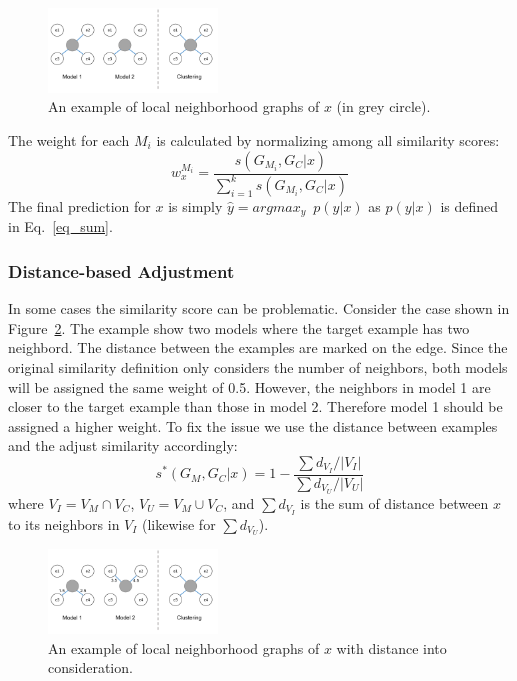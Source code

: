 \begin{figure}[h]
\centering
    \includegraphics[width=0.4\textwidth]{./fig/lwe_graph}
\caption{An example of local neighborhood graphs of $x$ (in grey circle).}
\label{fig:graph}
\end{figure}

The weight for each $M_i$ is calculated by normalizing among all similarity scores:
\begin{equation}\label{eq_norm}
w_{x}^{M_i} = \frac {s(G_{M_i}, G_C|x)} {\sum_{i=1}^k s(G_{M_i}, G_C|x)}
\end{equation}
The final prediction for $x$ is simply $\hat y = argmax_y \enspace p(y|x)$ as $p(y|x)$ is defined in Eq.~\ref{eq_sum}.

\subsubsection{Distance-based Adjustment}
In some cases the similarity score can be problematic. Consider the case shown in Figure~\ref{graph_dist}. 
The example show two models where the target example has two neighbord.  The distance between the examples are marked on the edge. 
Since the original similarity definition only considers the number of neighbors, both models will be assigned the same weight of 0.5. 
However, the neighbors in model 1 are closer to the target example than those in model 2.  Therefore model 1 should be assigned a higher
weight.
To fix the issue we use the distance between examples and the adjust similarity accordingly:
\begin{equation}\label{d_sim}
s^\ast(G_M, G_C|x) = 1 - \frac {\sum d_{V_I}/|V_I|} {\sum d_{V_U}/|V_U|}
\end{equation}
where $V_I = V_M \cap V_C$, $V_U = V_M \cup V_C$, and $\sum d_{V_I}$ is the sum of distance between $x$ to its neighbors in $V_I$ (likewise for $\sum d_{V_U}$).

\begin{figure}[h]
\centering
    \includegraphics[width=0.4\textwidth]{./fig/lwe_d_graph}
\caption{An example of local neighborhood graphs of $x$ with distance into consideration.}
\label{graph_dist}
\end{figure}


